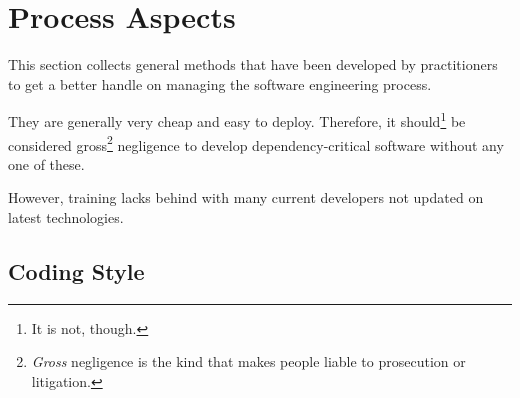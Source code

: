 \section{Process Aspects}

This section collects general methods that have been developed by practitioners to get a better handle on managing the software engineering process.

They are generally very cheap and easy to deploy.
Therefore, it should\footnote{It is not, though.} be considered gross\footnote{\emph{Gross} negligence is the kind that makes people liable to prosecution or litigation.} negligence to develop dependency-critical software without any one of these.

However, training lacks behind with many current developers not updated on latest technologies.
   
\subsection{Coding Style}
  
